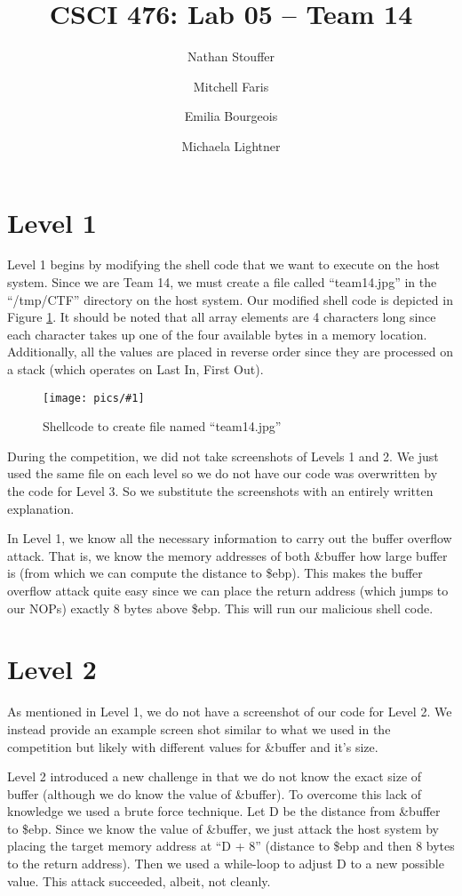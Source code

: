 \documentclass[11pt]{article}
\newcommand{\fig}[2]{ 
\begin{figure}[h]
	\centering
	\caption{#2}
	\texttt{[image: pics/\#1]}
	\label{fig:#1}
\end{figure} 
}
\begin{document}
\title{CSCI 476: Lab 05 -- Team 14}
\author{Nathan Stouffer \and Mitchell Faris \and Emilia Bourgeois \and Michaela Lightner}
\maketitle
\newpage

\section*{Level 1}

Level 1 begins by modifying the shell code that we want to execute on the host system. Since we are Team 14, we must create a file called ``team14.jpg'' in the ``/tmp/CTF'' directory on the host system. Our modified shell code is depicted in Figure \ref{fig:level1}. It should be noted that all array elements are 4 characters long since each character takes up one of the four available bytes in a memory location. Additionally, all the values are placed in reverse order since they are processed on a stack (which operates on Last In, First Out).

\fig{level1}{Shellcode to create file named ``team14.jpg''}

During the competition, we did not take screenshots of Levels 1 and 2. We just used the same file on each level so we do not have our code was overwritten by the code for Level 3. So we substitute the screenshots with an entirely written explanation.

In Level 1, we know all the necessary information to carry out the buffer overflow attack. That is, we know the memory addresses of both \&buffer how large buffer is (from which we can compute the distance to \$ebp). This makes the buffer overflow attack quite easy since we can place the return address (which jumps to our NOPs) exactly 8 bytes above \$ebp. This will run our malicious shell code.

\newpage

\section*{Level 2}

As mentioned in Level 1, we do not have a screenshot of our code for Level 2. We instead provide an example screen shot similar to what we used in the competition but likely with different values for \&buffer and it's size.

Level 2 introduced a new challenge in that we do not know the exact size of buffer (although we do know the value of \&buffer). To overcome this lack of knowledge we used a brute force technique. Let D be the distance from \&buffer to \$ebp. Since we know the value of \&buffer, we just attack the host system by placing the target memory address at ``D + 8'' (distance to \$ebp and then 8 bytes to the return address). Then we used a while-loop to adjust D to a new possible value. This attack succeeded, albeit, not cleanly.
\end{document}

